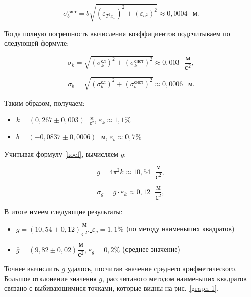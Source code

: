 \documentclass[a4paper,12pt]{article}
\begin{document}
\begin{equation}
\sigma^\text{сист}_b = b\sqrt{\left( \varepsilon_{T^2x_\text{ц}} \right)^2 + \left( \varepsilon_{a^2} \right)^2 } \approx  0,0004 \text{ }\text{м}.
\end{equation}

Тогда полную погрешность вычисления коэффициентов подсчитываем по следующей формуле:

\begin{equation}
\sigma_k = \sqrt{\left( \sigma_k^\text{сл} \right)^2 + \left( \sigma_k^\text{сист} \right)^2 } \approx 0,003 \text{ }\frac{\text{м}}{\text{с}^2},
\end{equation}

\begin{equation}
\sigma_b = \sqrt{\left( \sigma_b^\text{сл} \right)^2 + \left( \sigma_b^\text{сист} \right)^2 } \approx 0,0006 \text{ }\text{м}.
\end{equation}

Таким образом, получаем:
\begin{itemize}
	\item $ k = \left( 0,267\pm0,003\right)  \text{ }\frac{\text{м}}{\text{с}^2} $, $ \varepsilon_k \approx 1,1 \% $
	\item $ b = \left( -0,0837\pm0,0006\right)  \text{ }\text{м} $, $ \varepsilon_b \approx 0,7 \% $
\end{itemize}

Учитывая формулу \eqref{koef}, вычисляем $ g $:

\begin{equation}
g = 4\pi^2k \approx 10,54 \text{ }\frac{\text{м}}{\text{с}^2},
\end{equation}

\begin{equation}
\sigma_g = g\cdot\varepsilon_k \approx 0,12 \text{ }\frac{\text{м}}{\text{с}^2},
\end{equation}

В итоге имеем следующие результаты:

\begin{itemize}
	\item \underline{$ g = \left(10,54\pm0,12\right) \dfrac{\text{м}}{\text{с}^2} $, $ \varepsilon_g=1,1\% $} (по методу наименьших квадратов)
	\item \underline{$ \overline{g} = (9,82 \pm 0,02) \dfrac{\text{м}}{\text{с}^2}$, $ \varepsilon_g=0,2\% $} (среднее значение)
\end{itemize}

Точнее вычислить $g$ удалось, посчитав значение среднего арифметического. Большое отклонение значения $g$, рассчитаного методом наименьших квадратов связано с выбивающимися точками, которые видны на рис. \ref{graph-1}.
\end{document}
